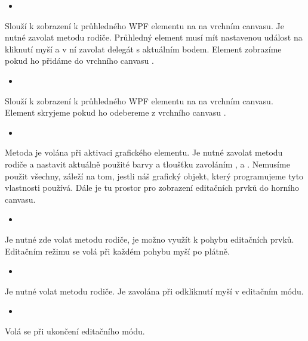 \documentclass[
  field=inf,
  biblatex,
  glossaries,
  index
]{kidiplom}
\begin{document}
\begin{itemize}
\item {}
\end{itemize}
Slouží k zobrazení k průhledného WPF elementu na na vrchním canvasu. Je nutné zavolat metodu rodiče. Průhledný element musí mít nastavenou událost na kliknutí myší a v ní zavolat delegát  s aktuálním bodem. Element zobrazíme pokud ho přidáme do vrchního canvasu .

\begin{itemize}
\item {}
\end{itemize}
Slouží k zobrazení k průhledného WPF elementu na na vrchním canvasu. Element skryjeme pokud ho odebereme z vrchního canvasu .

\begin{itemize}
\item {}
\end{itemize}
Metoda je volána při aktivaci grafického elementu. Je nutné zavolat metodu rodiče a nastavit aktuálně použité barvy a tloušťku zavoláním ,  a . Nemusíme použit všechny, záleží na tom, jestli náš grafický objekt, který programujeme tyto vlastnosti používá.
Dále je tu prostor pro zobrazení editačních prvků do horního canvasu.

\begin{itemize}
\item {}
\end{itemize}
Je nutné zde volat metodu rodiče, je možno využít k pohybu editačních prvků. Editačním režimu se volá při každém pohybu myší po plátně.

\begin{itemize}
\item {}
\end{itemize}
Je nutné volat metodu rodiče. Je zavolána při odkliknutí myší v editačním módu.

\begin{itemize}
\item {}
\end{itemize}
Volá se při ukončení editačního módu.
\end{document}
